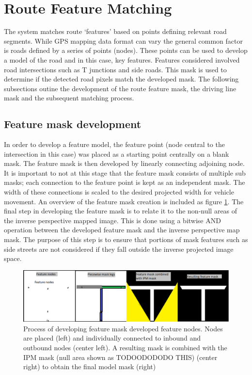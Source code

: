 \documentclass[]{aiaa-tc}%
\begin{document}
\section{Route Feature Matching}\label{sect:route_feature_matching}

The system matches route `features' based on points defining relevant road segments. While GPS mapping data format can vary the general common factor is roads defined by a series of points (nodes). These points can be used to develop a model of the road and in this case, key features. Features considered involved road intersections such as T junctions and side roads. This mask is used to determine if the detected road pixels match the developed mask. The following subsections outine the development of the route feature mask, the driving line mask and the subsequent matching process.

\subsection{Feature mask development} \label{s:maskDevelopment}

In order to develop a feature model, the feature point (node central to the intersection in this case) was placed as a starting point centrally on a blank mask. The feature mask is then developed by linearly connecting adjoining node. It is important to not at this stage that the feature mask consists of multiple sub masks; each connection to the feature point is kept as an independent mask. The width of these connections is scaled to the desired projected width for vehicle movement. An overview of the feature mask creation is included as figure \ref{f:featureMaskDevelopment}. The final step in developing the feature mask is to relate it to the non-null areas of the inverse perspective mapped image. This is done using a bitwise AND operation between the developed feature mask and the inverse perspective map mask. The purpose of this step is to ensure that portions of mask features such as side streets are not considered if they fall outside the inverse projected image space. 

\begin{figure}
	\centering
	\includegraphics[width=1\textwidth]{FeatureMatching/featureMaskDevelopment.png}
	\caption{Process of developing feature mask developed feature nodes. Nodes are placed (left) and individually connected to inbound and outbound nodes (center left). A resulting mask is combined with the IPM mask (null area shown as TODOODODODO THIS) (center right) to obtain the final model mask (right)}
	\label{f:featureMaskDevelopment}
\end{figure}
\end{document}
